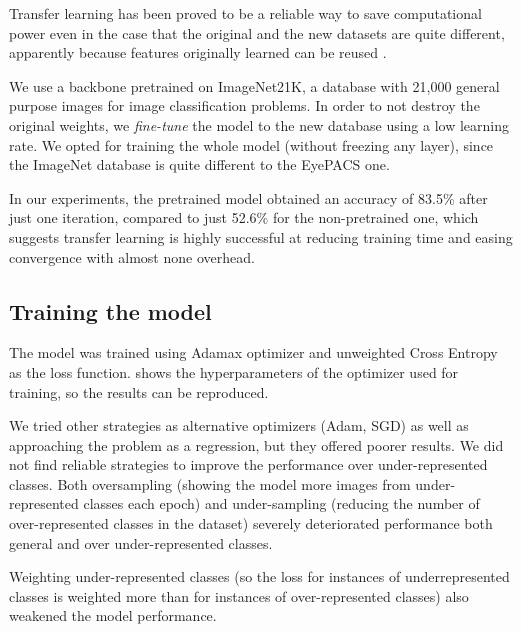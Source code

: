 Transfer learning has been proved to be a reliable way to save computational power even in the case that the original and the new datasets are quite different, apparently because features originally learned can be reused \cite{haslum2022makes}.

We use a backbone pretrained on ImageNet21K, a database with 21,000 general purpose images for image classification problems. In order to not destroy the original weights, we \textit{fine-tune} the model to the new database using a low learning rate. We opted for training the whole model (without freezing any layer), since the ImageNet database is quite different to the EyePACS one.

In our experiments, the pretrained model obtained an accuracy of 83.5\% after just one iteration, compared to just 52.6\% for the non-pretrained one, which suggests transfer learning is highly successful at reducing training time and easing convergence with almost none overhead.

\subsection{Training the model}
The model was trained using Adamax optimizer \cite{kingma2017adam} and unweighted Cross Entropy as the loss function.  shows the hyperparameters of the optimizer used for training, so the results can be reproduced.

We tried other strategies as alternative optimizers (Adam, SGD) as well as approaching the problem as a regression, but they offered poorer results. We did not find reliable strategies to improve the performance over under-represented classes. Both oversampling (showing the model more images from under-represented classes each epoch) and under-sampling (reducing the number of over-represented classes in the dataset) severely deteriorated performance both general and over under-represented classes. 

Weighting under-represented classes (so the loss for instances of underrepresented classes is weighted more than for instances of over-represented classes) also weakened the model performance.

